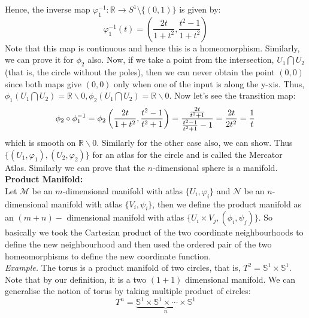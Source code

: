 Hence, the inverse map \( \varphi_1^{-1}: \mathbb{R} \to S^1 \setminus \{(0,1)\} \) is given by:
\[
\boxed{
\varphi_1^{-1}(t) = \left( \frac{2t}{1 + t^2}, \frac{t^2 - 1}{1 + t^2} \right)
}
\]
Note that this map is continuous and hence this is a homeomorphism. Similarly, we can prove it for $\phi_2$ also. Now, if we take a point from the intersection, $U_1\bigcap U_2$ (that is, the circle without the poles), then we can never obtain the point $(0,0)$ since both maps give $(0,0)$ only when one of the input is along the y-xis. Thus, $\phi_1(U_1\bigcap U_2) = \mathbb{R}\backslash 0, \phi_2(U_1\bigcap U_2) = \mathbb{R}\backslash 0$. Now let's see the transition map: 
$$\phi_2 \circ \phi_1^{-1} = \phi_2 \left( \frac{2t}{1+t^2}, \frac{t^2-1}{t^2+1} \right) = \frac{\frac{2t}{t^2+1}}{\frac{t^2-1}{t^2+1}-1} = \frac{2t}{2t^2} = \frac{1}{t}$$ which is smooth on $\mathbb{R}\backslash 0 $. Similarly for the other case also, we can show. Thus $\{(U_1, \varphi_1), (U_2, \varphi_2)\}$ for an atlas for the circle and is called the Mercator Atlas. 
Similarly we can prove that the $n$-dimensional sphere is a manifold. \\[0.3cm]
\textbf{Product Manifold:}\\[0.2cm]
Let $\mathcal{M}$ be an $m$-dimensional manifold with atlas $\{U_i,\varphi_i\}$ and $\mathcal{N}$ be an $n$-dimensional manifold with atlas $\{V_i,\psi_i\}$, then we define the product manifold as an $(m+n)-$ dimensional manifold with atlas $\{U_i\times V_j, (\phi_i , \psi_j)\}$. So basically we took the Cartesian product of the two coordinate neighbourhoods to define the new neighbourhood and then used the ordered pair of the two homeomorphisms to define the new coordinate function. \\[0.3cm]
\textit{Example.} The torus is a product manifold of two circles, that is, $T^2 = \mathbb{S}^1\times \mathbb{S}^1$. Note that by our definition, it is a two $(1+1)$ dimensional manifold. We can generalise the notion of torus by taking multiple product of circles: $$T^n = \underbrace{\mathbb{S}^1\times \mathbb{S}^1\times \cdots \times \mathbb{S}^1}_n$$ 
